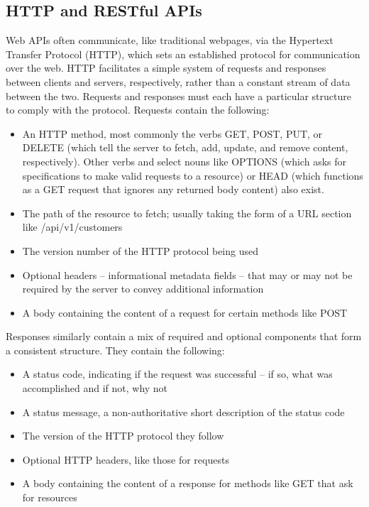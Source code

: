 \subsection{HTTP and RESTful APIs}

Web APIs often communicate, like traditional webpages, via the Hypertext Transfer Protocol (HTTP), which sets an established protocol for communication over the web. HTTP facilitates a simple system of requests and responses between clients and servers, respectively, rather than a constant stream of data between the two. Requests and responses must each have a particular structure to comply with the protocol. Requests contain the following:

\begin{itemize}
	\item An HTTP method, most commonly the verbs GET, POST, PUT, or DELETE (which tell the server to fetch, add, update, and remove content, respectively). Other verbs and select nouns like OPTIONS (which asks for specifications to make valid requests to a resource) or HEAD (which functions as a GET request that ignores any returned body content) also exist.
	\item The path of the resource to fetch; usually taking the form of a URL section like /api/v1/customers
	\item The version number of the HTTP protocol being used
	\item Optional headers -- informational metadata fields -- that may or may not be required by the server to convey additional information
	\item A body containing the content of a request for certain methods like POST
\end{itemize}

Responses similarly contain a mix of required and optional components that form a consistent structure. They contain the following:

\begin{itemize}
	\item A status code, indicating if the request was successful -- if so, what was accomplished and if not, why not
	\item A status message, a non-authoritative short description of the status code
	\item The version of the HTTP protocol they follow
	\item Optional HTTP headers, like those for requests
	\item A body containing the content of a response for methods like GET that ask for resources
\end{itemize}

